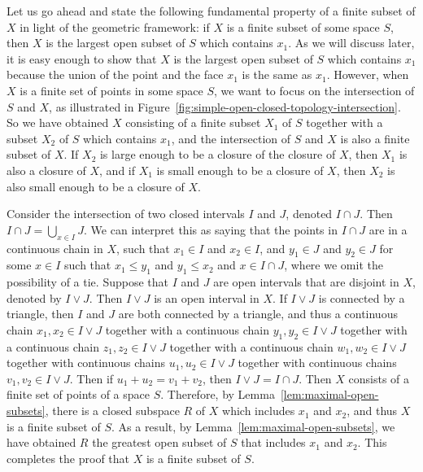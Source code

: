 \documentclass[a4paper,reqno,oneside]{article}
\begin{document}
Let us go ahead and state the following fundamental property of a finite subset of $X$ in light of the geometric framework: if $X$ is a finite subset of some space $S$, then $X$ is the largest open subset of $S$ which contains $x_1$. As we will discuss later, it is easy enough to show that $X$ is the largest open subset of $S$ which contains $x_1$ because the union of the point and the face $x_1$ is the same as $x_1$. However, when $X$ is a finite set of points in some space $S$, we want to focus on the intersection of $S$ and $X$, as illustrated in Figure~\ref{fig:simple-open-closed-topology-intersection}. So we have obtained $X$ consisting of a finite subset $X_1$ of $S$ together with a subset $X_2$ of $S$ which contains $x_1$, and the intersection of $S$ and $X$ is also a finite subset of $X$. If $X_2$ is large enough to be a closure of the closure of $X$, then $X_1$ is also a closure of $X$, and if $X_1$ is small enough to be a closure of $X$, then $X_2$ is also small enough to be a closure of $X$. 

%
\begin{example}[Intersection]
    Consider the intersection of two closed intervals $I$ and $J$, denoted $I \cap J$. Then $I \cap J = \bigcup_{x \in I} J$. We can interpret this as saying that the points in $I \cap J$ are in a continuous chain in $X$, such that $x_1 \in I$ and $x_2 \in I$, and $y_1 \in J$ and $y_2 \in J$ for some $x \in I$ such that $x_1 \leq y_1$ and $y_1 \leq x_2$ and $x \in I \cap J$, where we omit the possibility of a tie.
    Suppose that $I$ and $J$ are open intervals that are disjoint in $X$, denoted by $I \vee J$. Then $I \vee J$ is an open interval in $X$. If $I \vee J$ is connected by a triangle, then $I$ and $J$ are both connected by a triangle, and thus a continuous chain $x_1, x_2 \in I \vee J$ together with a continuous chain $y_1, y_2 \in I \vee J$ together with a continuous chain $z_1, z_2 \in I \vee J$ together with a continuous chain $w_1, w_2 \in I \vee J$ together with continuous chains $u_1, u_2 \in I \vee J$ together with continuous chains $v_1, v_2 \in I \vee J$. Then if $u_1 + u_2 = v_1 + v_2$, then $I \vee J = I \cap J$. Then $X$ consists of a finite set of points of a space $S$. Therefore, by Lemma~\ref{lem:maximal-open-subsets}, there is a closed subspace $R$ of $X$ which includes $x_1$ and $x_2$, and thus $X$ is a finite subset of $S$.
    As a result, by Lemma~\ref{lem:maximal-open-subsets}, we have obtained $R$ the greatest open subset of $S$ that includes $x_1$ and $x_2$. This completes the proof that $X$ is a finite subset of $S$.
\end{example}
\end{document}

